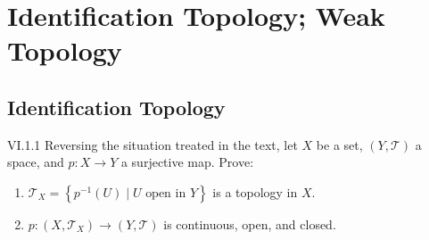 \chapter{Identification Topology; Weak Topology}

\section{Identification Topology}

\begin{problem}{VI.1.1}\label{problem:VI.1.1}
Reversing the situation treated in the text, let \(X\) be a set, \( (Y, \mathscr{T}) \) a space, and \( p: X \to Y \) a surjective map. Prove:
\begin{enumerate}[label={(\alph*)}]
	\item \( \mathscr{T}_{X} = \left\{ p^{-1}(U) \mid U \text{ open in } Y \right\} \) is a topology in \( X \).
	\item \( p: (X, \mathscr{T}_{X}) \to (Y, \mathscr{T}) \) is continuous, open, and closed.
\end{enumerate}
\end{problem}

